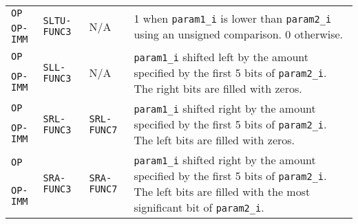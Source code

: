 {\begin{tabularx}{0.9\textwidth}{|l|l|l|X|}
  \hline
  \texttt{OP} & \multirow{2}{*}{\texttt{SLTU-FUNC3}} & \multirow{2}{*}{N/A} & \multirow{2}{0.46\textwidth}{1 when \texttt{param1\_i} is lower than \texttt{param2\_i} using an unsigned comparison. 0 otherwise.} \\
  \cline{1-1}
  \texttt{OP-IMM} &  &  & \\
  \hline
  \texttt{OP} & \multirow{2}{*}{\texttt{SLL-FUNC3}} & \multirow{2}{*}{N/A} & \multirow{2}{0.46\textwidth}{\texttt{param1\_i} shifted left by the amount specified by the first 5 bits of \texttt{param2\_i}. The right bits are filled with zeros.} \\
  \cline{1-1}
  \texttt{OP-IMM} & &  & \\
  \hline
  \texttt{OP} & \multirow{2}{*}{\texttt{SRL-FUNC3}} & \multirow{2}{*}{\texttt{SRL-FUNC7}} & \multirow{2}{0.46\textwidth}{\texttt{param1\_i} shifted right by the amount specified by the first 5 bits of \texttt{param2\_i}. The left bits are filled with zeros.} \\
  \cline{1-1}
  \texttt{OP-IMM} & &  & \\
  \hline
  \texttt{OP} & \multirow{2}{*}{\texttt{SRA-FUNC3}} & \multirow{2}{*}{\texttt{SRA-FUNC7}} & \multirow{2}{0.46\textwidth}{\texttt{param1\_i} shifted right by the amount specified by the first 5 bits of \texttt{param2\_i}. The left bits are filled with the most significant bit of \texttt{param2\_i}.} \\
  \cline{1-1}
  \texttt{OP-IMM} &  &  & \\
  \hline
\end{tabularx}
}

